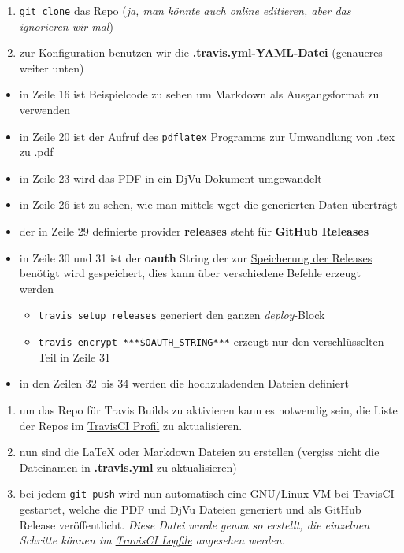 \documentclass[]{article}
\providecommand{\tightlist}{
  \setlength{\itemsep}{0pt}\setlength{\parskip}{0pt}}
\begin{document}
\begin{enumerate}
\def\labelenumi{\arabic{enumi}.}
\tightlist
\item
  \texttt{git\ clone} das Repo (\emph{ja, man könnte auch online
  editieren, aber das ignorieren wir mal})
\item
  zur Konfiguration benutzen wir die \textbf{.travis.yml-YAML-Datei}
  (genaueres weiter unten)
\end{enumerate}

\begin{itemize}
\tightlist
\item
  in Zeile 16 ist Beispielcode zu sehen um Markdown als Ausgangsformat
  zu verwenden
\item
  in Zeile 20 ist der Aufruf des \texttt{pdflatex} Programms zur
  Umwandlung von .tex zu .pdf
\item
  in Zeile 23 wird das PDF in ein
  \href{https://de.wikipedia.org/wiki/DjVu}{DjVu-Dokument} umgewandelt
\item
  in Zeile 26 ist zu sehen, wie man mittels wget die generierten Daten
  überträgt
\item
  der in Zeile 29 definierte provider \textbf{releases} steht für
  \textbf{GitHub Releases}
\item
  in Zeile 30 und 31 ist der \textbf{oauth} String der zur
  \href{http://docs.travis-ci.com/user/deployment/releases/}{Speicherung
  der Releases} benötigt wird gespeichert, dies kann über verschiedene
  Befehle erzeugt werden

  \begin{itemize}
  \tightlist
  \item
    \texttt{travis\ setup\ releases} generiert den ganzen
    \emph{deploy}-Block
  \item
    \texttt{travis\ encrypt\ ***\$OAUTH\_STRING***} erzeugt nur den
    verschlüsselten Teil in Zeile 31
  \end{itemize}
\item
  in den Zeilen 32 bis 34 werden die hochzuladenden Dateien definiert
\end{itemize}

\begin{enumerate}
\def\labelenumi{\arabic{enumi}.}
\tightlist
\item
  um das Repo für Travis Builds zu aktivieren kann es notwendig sein,
  die Liste der Repos im \href{https://travis-ci.org/profile}{TravisCI
  Profil} zu aktualisieren.
\item
  nun sind die LaTeX oder Markdown Dateien zu erstellen (vergiss nicht
  die Dateinamen in \textbf{.travis.yml} zu aktualisieren)
\item
  bei jedem \texttt{git\ push} wird nun automatisch eine GNU/Linux VM
  bei TravisCI gestartet, welche die PDF und DjVu Dateien generiert und
  als GitHub Release veröffentlicht. \emph{Diese Datei wurde genau so
  erstellt, die einzelnen Schritte können im
  \href{https://travis-ci.org/SimonWaldherr/testrepo}{TravisCI Logfile}
  angesehen werden.}
\end{enumerate}
\end{document}
